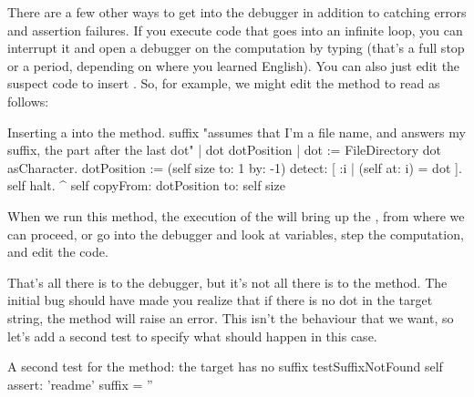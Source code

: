 \documentclass[a4paper,10pt,twoside]{book}
\begin{document}
There are a few other ways to get into the debugger in addition to catching errors and assertion failures.
If you execute code that goes into an infinite loop, you can interrupt it and open a debugger on the computation by typing  (that's a full stop or a period, depending  on where you learned English).
You can also just edit the suspect code to insert .
So, for example, we might edit the  method to read as follows:

\needspace{11ex}
\begin{method}[suffix]{Inserting a  into the  method.}
suffix
	"assumes that I'm a file name, and answers my suffix, the part after the last dot"
	| dot dotPosition |
	dot := FileDirectory dot asCharacter.
	dotPosition := (self size to: 1 by: -1) detect: [ :i | (self at: i) = dot ].
	self halt.
	^ self copyFrom: dotPosition to: self size 
\end{method}

When we run this method, the execution of the  will bring up the , from where we can proceed, or go into the debugger and look at variables, step the computation, and edit the code.

That's all there is to the debugger, but it's not all there is to the  method.  
The initial bug should have made you realize that if there is no dot in the target string, the  method will raise an error.  
This isn't the behaviour that we want, so let's add a second test to specify what should happen in this case.

\begin{method}[testNoSuffix]{A second test for the  method: the target has no suffix}
testSuffixNotFound
	self assert: 'readme' suffix = ''
\end{method}


\end{document}
